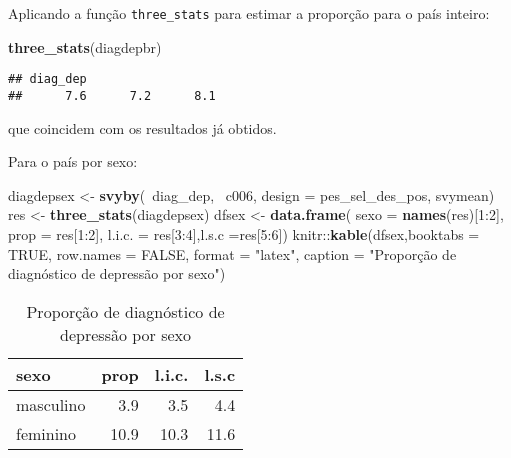 \documentclass[]{book}
\newenvironment{Shaded}{\begin{snugshade}}{\end{snugshade}}
\newcommand{\KeywordTok}[1]{\textcolor[rgb]{0.13,0.29,0.53}{\textbf{{#1}}}}
\newcommand{\DataTypeTok}[1]{\textcolor[rgb]{0.13,0.29,0.53}{{#1}}}
\newcommand{\DecValTok}[1]{\textcolor[rgb]{0.00,0.00,0.81}{{#1}}}
\newcommand{\StringTok}[1]{\textcolor[rgb]{0.31,0.60,0.02}{{#1}}}
\newcommand{\OtherTok}[1]{\textcolor[rgb]{0.56,0.35,0.01}{{#1}}}
\newcommand{\NormalTok}[1]{{#1}}
\theoremstyle{definition}
\theoremstyle{definition}
\theoremstyle{remark}
\begin{document}
Aplicando a função \texttt{three\_stats} para estimar a proporção para o
país inteiro:

\begin{Shaded}
\begin{Highlighting}[]
\KeywordTok{three_stats}\NormalTok{(diagdepbr)}
\end{Highlighting}
\end{Shaded}

\begin{verbatim}
## diag_dep                   
##      7.6      7.2      8.1
\end{verbatim}

que coincidem com os resultados já obtidos.

Para o país por sexo:

\begin{Shaded}
\begin{Highlighting}[]
\NormalTok{diagdepsex <-}\StringTok{ }\KeywordTok{svyby}\NormalTok{(~diag_dep, ~c006, }\DataTypeTok{design =} \NormalTok{pes_sel_des_pos, }
  \NormalTok{svymean)}
\NormalTok{res <-}\StringTok{ }\KeywordTok{three_stats}\NormalTok{(diagdepsex)}
\NormalTok{dfsex <-}\StringTok{ }\KeywordTok{data.frame}\NormalTok{( }\DataTypeTok{sexo =} \KeywordTok{names}\NormalTok{(res)[}\DecValTok{1}\NormalTok{:}\DecValTok{2}\NormalTok{], }\DataTypeTok{prop =} \NormalTok{res[}\DecValTok{1}\NormalTok{:}\DecValTok{2}\NormalTok{], }\DataTypeTok{l.i.c. =} \NormalTok{res[}\DecValTok{3}\NormalTok{:}\DecValTok{4}\NormalTok{],}\DataTypeTok{l.s.c =}\NormalTok{res[}\DecValTok{5}\NormalTok{:}\DecValTok{6}\NormalTok{])}
\NormalTok{knitr::}\KeywordTok{kable}\NormalTok{(dfsex,}\DataTypeTok{booktabs =} \OtherTok{TRUE}\NormalTok{, }\DataTypeTok{row.names =} \OtherTok{FALSE}\NormalTok{, }\DataTypeTok{format =} \StringTok{"latex"}\NormalTok{, }
\DataTypeTok{caption =} \StringTok{"Proporção de diagnóstico de depressão por sexo"}\NormalTok{)}
\end{Highlighting}
\end{Shaded}

\begin{table}

\caption{\label{tab:unnamed-chunk-51}Proporção de diagnóstico de depressão por sexo}
\centering
\begin{tabular}[t]{lrrr}
\toprule
sexo & prop & l.i.c. & l.s.c\\
\midrule
masculino & 3.9 & 3.5 & 4.4\\
feminino & 10.9 & 10.3 & 11.6\\
\bottomrule
\end{tabular}
\end{table}
\end{document}
